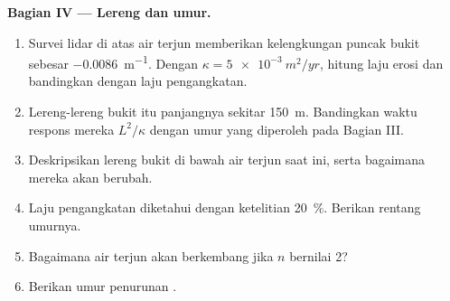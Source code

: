 \begin{problem}
\medskip\noindent\textbf{Bagian IV --- Lereng dan umur.}
\begin{enumerate}[resume]
\item Survei lidar di atas air terjun memberikan kelengkungan puncak bukit sebesar
  \qty{-0.0086}{m^{-1}}. Dengan $\kappa = \qty{5e-3}{m^2/yr}$, hitung
  laju erosi dan bandingkan dengan laju pengangkatan.
\item Lereng-lereng bukit itu panjangnya sekitar \qty{150}{m}. Bandingkan waktu respons
  mereka $L^2/\kappa$ dengan umur yang diperoleh pada Bagian III.
\item Deskripsikan lereng bukit di bawah air terjun saat ini, serta bagaimana
  mereka akan berubah.
\item Laju pengangkatan diketahui dengan ketelitian \qty{20}{\percent}. Berikan rentang
  umurnya.
\item Bagaimana air terjun akan berkembang jika $n$ bernilai 2?
\item Berikan umur penurunan .
\end{enumerate}
\end{problem}
